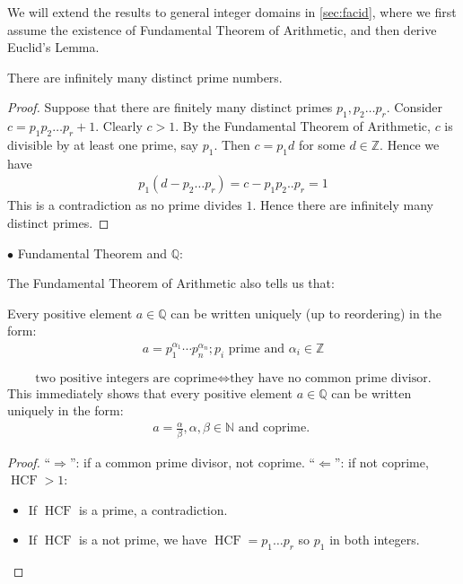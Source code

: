 \documentclass{article}
\newcommand{\HCF}{\operatorname{HCF}}
\begin{document}
\begin{rema}
We will extend the results to general integer domains in \cref{sec:facid}, where we first assume the existence of Fundamental Theorem of Arithmetic, and then derive Euclid’s Lemma.
\end{rema}
\begin{thma}
There are infinitely many distinct prime numbers.
\end{thma} 
\begin{proof}
Suppose that there are finitely many distinct primes $p_{1}, p_{2} \ldots p_{r} .$ Consider $c=p_{1} p_{2} \ldots p_{r}+1 .$ Clearly $c>1 .$ By the Fundamental Theorem of Arithmetic, $c$ is divisible by at least one prime, say $p_{1}$. Then $c=p_{1} d$ for some $d \in \mathbb{Z}$. Hence we have
\begin{align*}
p_{1}\left(d-p_{2} \ldots p_{r}\right)=c-p_{1} p_{2} . . p_{r}=1
\end{align*}
This is a contradiction as no prime divides $1 .$ Hence there are infinitely many distinct primes. 
\end{proof}
\begin{description}
\item[$\bullet$ Fundamental Theorem and $\mathbb{Q}$:] 
\end{description}
The Fundamental Theorem of Arithmetic also tells us that:
\begin{cora}
Every positive element $a \in \mathbb{Q}$ can be written uniquely (up to reordering) in the form:
\begin{align*}
a=p_{1}^{\alpha_{1}} \cdots p_{n}^{\alpha_{n}} ; p_{i} \text { prime and } \alpha_{i} \in \mathbb{Z}
\end{align*}
\end{cora}
\begin{cora}
$$\text{two positive integers are coprime} \Longleftrightarrow \text{they have no common prime divisor.}$$ This immediately shows that every positive element $a \in \mathbb{Q}$ can be written uniquely in the form:
\begin{align*}
a=\frac{\alpha}{\beta}, \alpha, \beta \in \mathbb{N} \text { and coprime. }
\end{align*}

\end{cora}
 
\begin{proof}
``$\Rightarrow$'': if a common prime divisor, not coprime. ``$\Leftarrow$'': if not coprime, $\HCF>1$:
\begin{itemize}
    \item If $\HCF$ is a prime, a contradiction. 
    \item If $\HCF$ is a not prime, we have $\HCF=p_1\ldots p_r$ so $p_1$ in both integers.
\end{itemize}
\end{proof}
\end{document}
